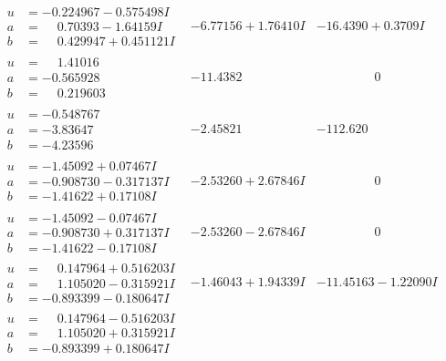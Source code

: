 \documentclass[1p]{elsarticle_modified}
\theoremstyle{definition}
\begin{document}
$$\begin{array}{c|c|c}
\begin{aligned}
u &= -0.224967 - 0.575498 I \\
a &= \phantom{-}0.70393 - 1.64159 I \\
b &= \phantom{-}0.429947 + 0.451121 I\end{aligned}
 & -6.77156 + 1.76410 I & -16.4390 + 0.3709 I \\ \hline\begin{aligned}
u &= \phantom{-}1.41016\phantom{ +0.000000I} \\
a &= -0.565928\phantom{ +0.000000I} \\
b &= \phantom{-}0.219603\phantom{ +0.000000I}\end{aligned}
 & -11.4382\phantom{ +0.000000I} & \phantom{-0.000000 } 0 \\ \hline\begin{aligned}
u &= -0.548767\phantom{ +0.000000I} \\
a &= -3.83647\phantom{ +0.000000I} \\
b &= -4.23596\phantom{ +0.000000I}\end{aligned}
 & -2.45821\phantom{ +0.000000I} & -112.620\phantom{ +0.000000I} \\ \hline\begin{aligned}
u &= -1.45092 + 0.07467 I \\
a &= -0.908730 - 0.317137 I \\
b &= -1.41622 + 0.17108 I\end{aligned}
 & -2.53260 + 2.67846 I & \phantom{-0.000000 } 0 \\ \hline\begin{aligned}
u &= -1.45092 - 0.07467 I \\
a &= -0.908730 + 0.317137 I \\
b &= -1.41622 - 0.17108 I\end{aligned}
 & -2.53260 - 2.67846 I & \phantom{-0.000000 } 0 \\ \hline\begin{aligned}
u &= \phantom{-}0.147964 + 0.516203 I \\
a &= \phantom{-}1.105020 - 0.315921 I \\
b &= -0.893399 - 0.180647 I\end{aligned}
 & -1.46043 + 1.94339 I & -11.45163 - 1.22090 I \\ \hline\begin{aligned}
u &= \phantom{-}0.147964 - 0.516203 I \\
a &= \phantom{-}1.105020 + 0.315921 I \\
b &= -0.893399 + 0.180647 I\end{aligned}

\end{array}$$
\end{document}
